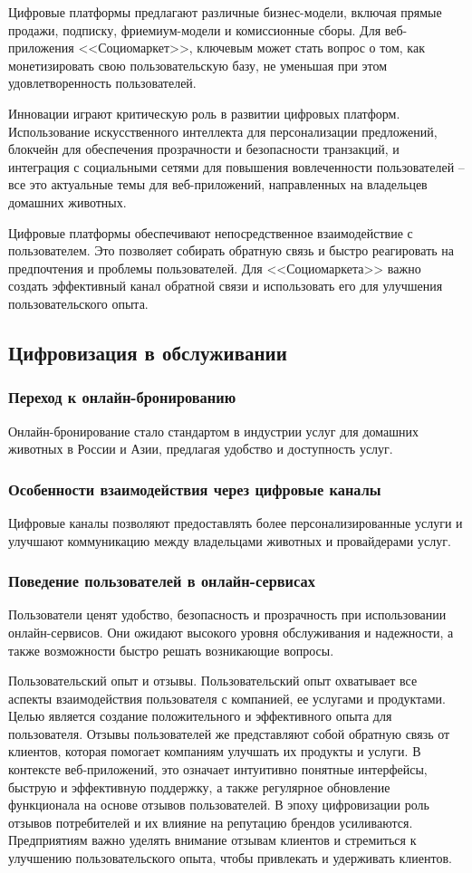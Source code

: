 Цифровые платформы предлагают различные бизнес-модели, включая прямые продажи, подписку, фриемиум-модели и комиссионные сборы. Для веб-приложения <<Социомаркет>>, ключевым может стать вопрос о том, как монетизировать свою пользовательскую базу, не уменьшая при этом удовлетворенность пользователей.

Инновации играют критическую роль в развитии цифровых платформ. Использование искусственного интеллекта для персонализации предложений, блокчейн для обеспечения прозрачности и безопасности транзакций, и интеграция с социальными сетями для повышения вовлеченности пользователей – все это актуальные темы для веб-приложений, направленных на владельцев домашних животных.

Цифровые платформы обеспечивают непосредственное взаимодействие с пользователем. Это позволяет собирать обратную связь и быстро реагировать на предпочтения и проблемы пользователей. Для <<Социомаркета>> важно создать эффективный канал обратной связи и использовать его для улучшения пользовательского опыта.
\subsection{Цифровизация в обслуживании}
\subsubsection{Переход к онлайн-бронированию}

Онлайн-бронирование стало стандартом в индустрии услуг для домашних животных в России и Азии, предлагая удобство и доступность услуг.
\subsubsection{Особенности взаимодействия через цифровые каналы}

Цифровые каналы позволяют предоставлять более персонализированные услуги и улучшают коммуникацию между владельцами животных и провайдерами услуг.
\subsubsection{Поведение пользователей в онлайн-сервисах}

Пользователи ценят удобство, безопасность и прозрачность при использовании онлайн-сервисов. Они ожидают высокого уровня обслуживания и надежности, а также возможности быстро решать возникающие вопросы.

Пользовательский опыт и отзывы. Пользовательский опыт охватывает все аспекты взаимодействия пользователя с компанией, ее услугами и продуктами. Целью является создание положительного и эффективного опыта для пользователя. Отзывы пользователей же представляют собой обратную связь от клиентов, которая помогает компаниям улучшать их продукты и услуги. В контексте веб-приложений, это означает интуитивно понятные интерфейсы, быструю и эффективную поддержку, а также регулярное обновление функционала на основе отзывов пользователей. В эпоху цифровизации роль отзывов потребителей и их влияние на репутацию брендов усиливаются. Предприятиям важно уделять внимание отзывам клиентов и стремиться к улучшению пользовательского опыта, чтобы привлекать и удерживать клиентов.

